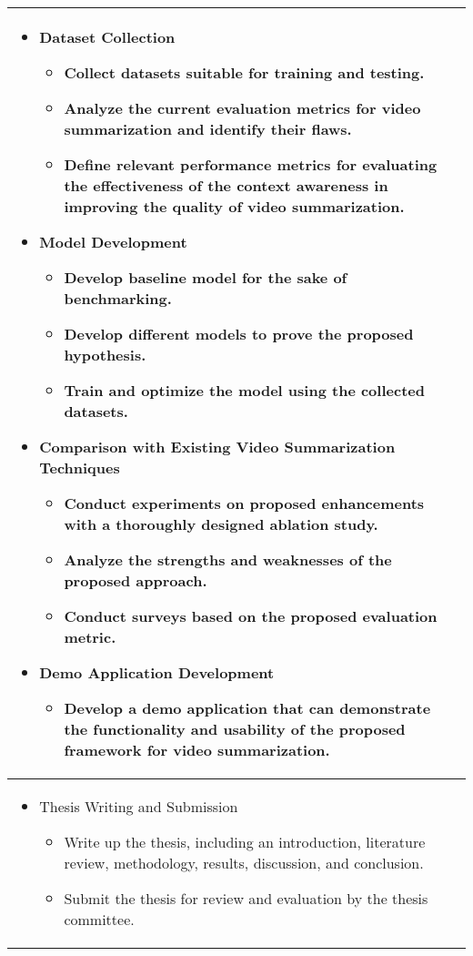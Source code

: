 \begin{longtable}{|l|c|}
\multicolumn{2}{|m{\linewidth}|}{\begin{itemize}
  \item Dataset Collection \begin{itemize}
    \item Collect datasets suitable for training and testing.
    \item Analyze the current evaluation metrics for video summarization and identify their flaws.
    \item Define relevant performance metrics for evaluating the effectiveness of the context awareness in improving the quality of video summarization.
  \end{itemize}
  \item Model Development\begin{itemize}
    \item Develop baseline model for the sake of benchmarking.
    \item Develop different models to prove the proposed hypothesis.
    \item Train and optimize the model using the collected datasets.
  \end{itemize}
  \item Comparison with Existing Video Summarization Techniques\begin{itemize}
    \item Conduct experiments on proposed enhancements with a thoroughly designed ablation study.
    \item Analyze the strengths and weaknesses of the proposed approach.
    \item Conduct surveys based on the proposed evaluation metric.
  \end{itemize}
  \item Demo Application Development\begin{itemize}
    \item Develop a demo application that can demonstrate the functionality and usability of the proposed framework for video summarization.
  \end{itemize}
\end{itemize}}\\
\hline

\multicolumn{2}{|m{\linewidth}}{\begin{itemize}
  \item Thesis Writing and Submission\begin{itemize}
    \item Write up the thesis, including an introduction, literature review, methodology, results, discussion, and conclusion.
    \item Submit the thesis for review and evaluation by the thesis committee.
  \end{itemize}
\end{itemize}}\\


\end{longtable}
